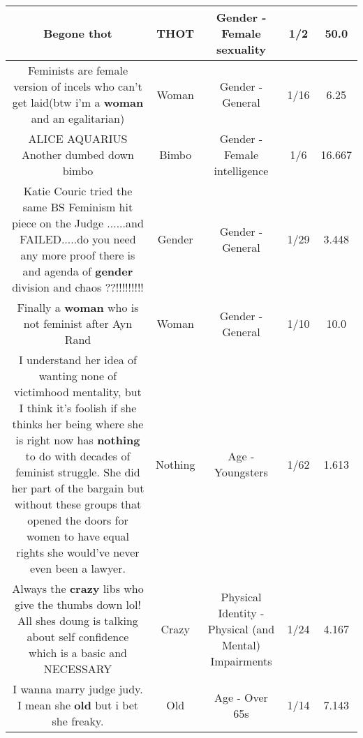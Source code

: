 \documentclass[11pt]{article}
\newlength\mylength
\begin{document}
\begin{center}
\begin{longtable}{|C{.65\mylength}|C{.30\mylength}|C{.12\mylength}|C{.12\mylength}|C{.12\mylength}|}
  \small Begone thot\normalsize   & THOT & Gender - Female sexuality & 1/2 & 50.0 \\  \hline
  \small Feminists are female version of incels who can't get laid(btw i'm a \textbf{woman} and an egalitarian)\normalsize   & Woman & Gender - General & 1/16 & 6.25 \\  \hline
  \small ALICE AQUARIUS Another dumbed down bimbo\normalsize   & Bimbo & Gender - Female intelligence & 1/6 & 16.667 \\  \hline
  \small Katie Couric tried the same BS Feminism hit piece on the Judge ......and FAILED.....do you need any more proof there is and agenda of \textbf{gender} division and chaos ??!!!!!!!!!\normalsize   & Gender & Gender - General & 1/29 & 3.448 \\  \hline
  \small Finally a \textbf{woman} who is not feminist after Ayn Rand\normalsize   & Woman & Gender - General & 1/10 & 10.0 \\  \hline
  \small I understand her idea of wanting none of victimhood mentality, but I think it's foolish if she thinks her being where she is right now has \textbf{nothing} to do with decades of feminist struggle. She did her part of the bargain but without these groups that opened the doors for women to have equal rights she would've never even been a lawyer.\normalsize   & Nothing & Age - Youngsters & 1/62 & 1.613 \\  \hline
  \small Always the \textbf{crazy} libs who give the thumbs down lol! All shes doung is talking about self confidence which is a basic and NECESSARY\normalsize   & Crazy & Physical Identity - Physical (and Mental) Impairments & 1/24 & 4.167 \\  \hline
  \small I wanna marry judge judy. I mean she \textbf{old} but i bet she freaky.\normalsize   & Old & Age - Over 65s & 1/14 & 7.143 \\  \hline

\end{longtable}
\end{center}
\end{document}
